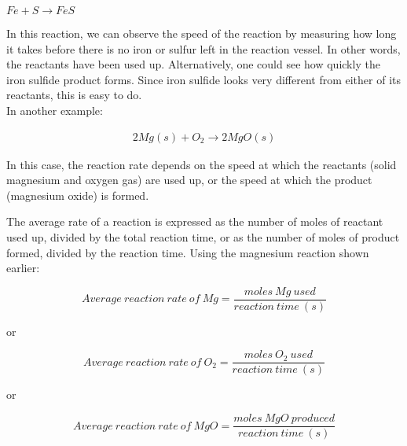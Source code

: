 \begin{center}
\rm${Fe + S \rightarrow FeS}$
\end{center}

In this reaction, we can observe the speed of the reaction by measuring how long it takes before there is no iron or sulfur left in the reaction vessel. In other words, the reactants have been used up. Alternatively, one could see how quickly the iron sulfide product forms. Since iron sulfide looks very different from either of its reactants, this is easy to do. \\

In another example:

\begin{eqnarray*}
2Mg(s) + O_{2} \rightarrow 2Mg O(s)
\end{eqnarray*}

In this case, the reaction rate depends on the speed at which the reactants (solid
magnesium and oxygen gas) are used up, or the speed at which the product (magnesium oxide) is formed.


The average rate of a reaction is expressed as the number of
moles of reactant used up, divided by the total reaction time, or as the number of moles of product formed, divided by the reaction time. Using the magnesium reaction shown earlier:

\begin{equation*}
Average \ reaction \ rate \ of \ Mg = \frac{moles \ Mg \ used}{reaction \ time \ (s)}
\end{equation*}

\begin{center}
or
\end{center}

\begin{equation*}
Average \ reaction \ rate \ of \ O_{2} = \frac{moles \ O_{2} \ used}{reaction \ time \ (s)}
\end{equation*}

\begin{center}
or
\end{center}

\begin{equation*}
Average \ reaction \ rate \ of \ MgO = \frac{moles \ MgO \ produced}{reaction \ time \ (s)}
\end{equation*}

